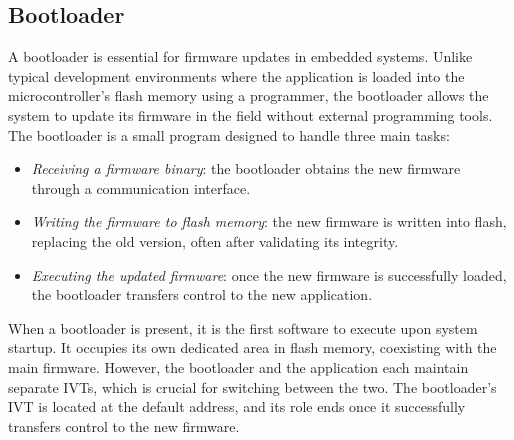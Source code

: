 \subsection{Bootloader}
A bootloader is essential for firmware updates in embedded systems. 
Unlike typical development environments where the application is loaded into the microcontroller's flash memory using a programmer, the bootloader allows the system to update its firmware in the field without external programming tools.
The bootloader is a small program designed to handle three main tasks:
\begin{itemize}
    \item \textit{Receiving a firmware binary}: the bootloader obtains the new firmware through a communication interface.
    \item \textit{Writing the firmware to flash memory}: the new firmware is written into flash, replacing the old version, often after validating its integrity.
    \item \textit{Executing the updated firmware}: once the new firmware is successfully loaded, the bootloader transfers control to the new application.
\end{itemize}
When a bootloader is present, it is the first software to execute upon system startup. 
It occupies its own dedicated area in flash memory, coexisting with the main firmware. 
However, the bootloader and the application each maintain separate IVTs, which is crucial for switching between the two. 
The bootloader's IVT is located at the default address, and its role ends once it successfully transfers control to the new firmware.

